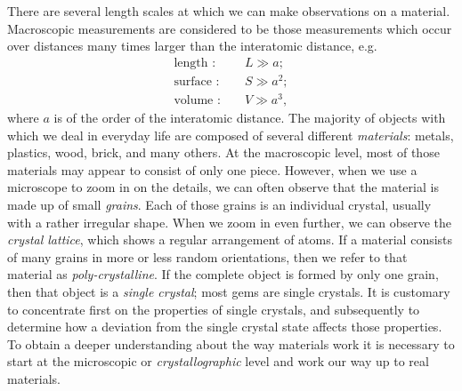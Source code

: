 There are several length scales at which we can make observations on a material.  Macroscopic measurements are considered to be those measurements which occur over distances many times larger than the interatomic distance, e.g.\
\begin{eqnarray}
	\mbox{length : }&&L \gg a; \nonumber\\
	\mbox{surface : }&&S \gg a^{2};\\
	\mbox{volume : }&&V \gg a^{3},\nonumber
\end{eqnarray}
where $a$ is of the order of the interatomic distance.  The majority of objects with which we deal in everyday life are composed of several different \textit{materials}: metals, plastics, wood, brick, and many others.  At the macroscopic level, most of those materials may appear to consist of only one piece.  However, when we use a microscope to zoom in on the details, we can often observe that the material is made up of small \textit{grains}.  Each of those grains is an individual crystal, usually with a rather irregular shape.  When we zoom in even further, we can observe the \textit{crystal lattice}, which shows a regular arrangement of atoms.  If a material consists of many grains in more or less random orientations, then we refer to that material as \textit{poly-crystalline}.  If the complete object is formed by only one grain, then that object is a \textit{single crystal}; most gems are single crystals.  It is customary to concentrate first on the properties of single crystals, and subsequently to determine how a deviation from the single crystal state affects those properties.  To obtain a deeper understanding about the way materials work it is necessary to start at the microscopic or \textit{crystallographic} level and work our way up to real materials.

